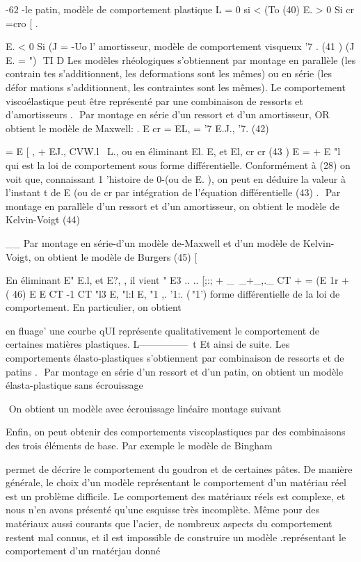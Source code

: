 -62 ­-le patin, modèle de comportement plastique 
L = 0 si < (To 
(40) E. > 0 Si cr 
=cro
[ . 

E. < 0 Si (J = -Uo 
l' amortisseur, modèle de comportement visqueux 
'7
. 
(41 ) (J E.
= ")  TI D 
Les modèles rhéologiques s'obtiennent par montage en parallèle (les contrain­
tes s'additionnent, les deformations sont les mêmes) ou en série (les défor­
mations s'additionnent, les contraintes sont les mêmes). 
Le comportement viscoélastique peut être représenté par une combi­naison de ressorts et d'amortisseurs . 
 Par montage en série d'un ressort et d'un amortisseur, OR obtient le modèle de Maxwell: 
. 
E
cr = EL, = '7 E.J., '7. 
(42) 
{ = E
[ , + EJ., 
CVW.l~ 
L.,
ou en éliminant El.
E, et El, 
cr cr
(43 ) E 
= + 
E 
"l 
qui est la loi de comportement sous forme différentielle. Conformément à (28) 
on voit que, connaissant 1 'histoire de 0-(ou de E. ), on peut en déduire la valeur à l'instant t de E (ou de cr par intégration de l'équation dif­férentielle (43) . 
 Par montage en parallèle d'un ressort et d'un amortisseur, on obtient le 
modèle de Kelvin-Voigt 
(44) 


__ Par montage en série-d'un modèle de-Maxwell et d'un modèle de Kelvin-Voigt, on obtient le modèle de Burgers 
(45) 
[ 


En éliminant E" E.l, et E?, , il vient 
" E3 .. .. [;:;
+ _~_+_,._ CT
+ = (E 1r +
( 46) E E CT -1 CT 
"l3 E, "l:l E, "1 ,. '1:. (\,"1') 
forme différentielle de la loi de comportement. En particulier, on obtient 


en fluage' une courbe qUI représente qualitativement le comportement de certaines matières plastiques. 
L---------------~t 
Et ainsi de suite. 
Les comportements élasto-plastiques s'obtiennent par combinaison de ressorts et de patins . 
 Par montage en série d'un ressort et d'un patin, on obtient un modèle 
élasta-plastique sans écrouissage 


 On obtient un modèle avec écrouissage linéaire montage suivant 

Enfin, on peut obtenir des comportements viscoplastiques par des combinaisons des trois éléments de base. Par exemple le modèle de Bingham 

permet de décrire le comportement du goudron et de certaines pâtes. 
De manière générale, le choix d'un modèle représentant le compor­tement d'un matériau réel est un problème difficile. Le comportement des matériaux réels est complexe, et nous n'en avons présenté qu'une esquisse 
très  incomplète.  Même  pour  des  matériaux aussi  courants  que  l'acier,  de  
nombreux  aspects  du  comportement  restent mal  connus,  et  il  est  impossible  
de  construire  un  modèle .représentant  le comportement  d'un rnatérjau donné  

}
